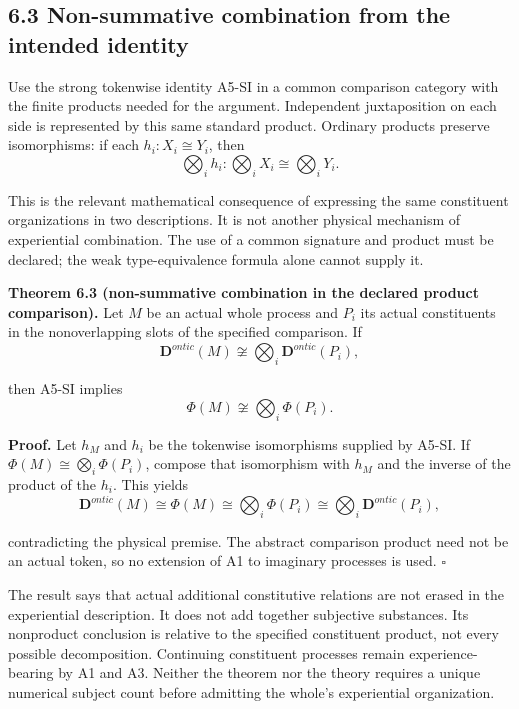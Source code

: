 \documentclass[
  11pt,
  a4paper,
]{article}
\begin{document}
\hypertarget{non-summative-combination-from-the-intended-identity}{%
\subsection{6.3 Non-summative combination from the intended
identity}\label{non-summative-combination-from-the-intended-identity}}

Use the strong tokenwise identity A5-SI in a common comparison category
with the finite products needed for the argument. Independent
juxtaposition on each side is represented by this same standard product.
Ordinary products preserve isomorphisms: if each \(h_i:X_i\cong Y_i\),
then
\nopagebreak[4]
\[
\bigotimes_i h_i:\bigotimes_i X_i\cong\bigotimes_i Y_i.
\]

This is the relevant mathematical consequence of expressing the same
constituent organizations in two descriptions. It is not another
physical mechanism of experiential combination. The use of a common
signature and product must be declared; the weak type-equivalence
formula alone cannot supply it.

\textbf{Theorem 6.3 (non-summative combination in the declared product
comparison).} Let \(M\) be an actual whole process and \(P_i\) its
actual constituents in the nonoverlapping slots of the specified
comparison. If
\nopagebreak[4]
\[
\mathbf D^{ontic}(M)\not\cong
\bigotimes_i\mathbf D^{ontic}(P_i),
\]

then A5-SI implies
\nopagebreak[4]
\[
\Phi(M)\not\cong\bigotimes_i\Phi(P_i).
\]

\textbf{Proof.} Let \(h_M\) and \(h_i\) be the tokenwise isomorphisms
supplied by A5-SI. If \(\Phi(M)\cong\bigotimes_i\Phi(P_i)\), compose
that isomorphism with \(h_M\) and the inverse of the product of the
\(h_i\). This yields
\nopagebreak[4]
\[
\mathbf D^{ontic}(M)
\cong\Phi(M)
\cong\bigotimes_i\Phi(P_i)
\cong\bigotimes_i\mathbf D^{ontic}(P_i),
\]

contradicting the physical premise. The abstract comparison product need
not be an actual token, so no extension of A1 to imaginary processes is
used. \(\square\)

The result says that actual additional constitutive relations are not
erased in the experiential description. It does not add together
subjective substances. Its nonproduct conclusion is relative to the
specified constituent product, not every possible decomposition.
Continuing constituent processes remain experience-bearing by A1 and A3.
Neither the theorem nor the theory requires a unique numerical subject
count before admitting the whole's experiential organization.
\end{document}
